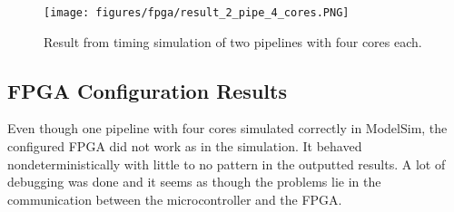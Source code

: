 \begin{figure}[H]
    \centering
    \texttt{[image: figures/fpga/result\_2\_pipe\_4\_cores.PNG]}
    \caption{Result from timing simulation of two pipelines with four cores each.}
    \label{fig:two_pipe_four_core}
\end{figure}


\subsection{FPGA Configuration Results}
Even though one pipeline with four cores simulated correctly in ModelSim, the configured FPGA
did not work as in the simulation. It behaved nondeterministically with little to no pattern
in the outputted results. A lot of debugging was done and it seems as though the problems
lie in the communication between the microcontroller and the FPGA.

